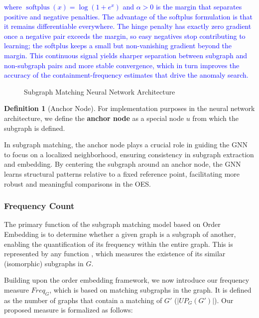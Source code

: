 \documentclass[preprint,12pt]{elsarticle}
\newcommand{\new}[1]{\textcolor{blue}{#1}}
\theoremstyle{plain}
\theoremstyle{definition}
\newtheorem{definition}{Definition}
\theoremstyle{remark}
\begin{document}
\new{where $\operatorname{softplus}(x) = \log(1 + e^{x})$ and $\alpha > 0$ is the margin that separates positive and negative penalties. The advantage of the softplus formulation is that it remains differentiable everywhere. The hinge penalty has exactly zero gradient once a negative pair exceeds the margin, so easy negatives stop contributing to learning; the softplus keeps a small but non-vanishing gradient beyond the margin. This continuous signal yields sharper separation between subgraph and non-subgraph pairs and more stable convergence, which in turn improves the accuracy of the containment-frequency estimates that drive the anomaly search.}

\begin{figure}[htbp]
    \centering
    \resizebox{1\linewidth}{!}{}
    \caption{Subgraph Matching Neural Network Architecture}
    \label{fig:network}
\end{figure}

\begin{definition}[Anchor Node]
For implementation purposes in the neural network architecture, we define the \textbf{anchor node} as a special node $u$ from which the subgraph is defined.
\end{definition}
In subgraph matching, the anchor node plays a crucial role in guiding the GNN to focus on a localized neighborhood, ensuring consistency in subgraph extraction and embedding. By centering the subgraph around an anchor node, the GNN learns structural patterns relative to a fixed reference point, facilitating more robust and meaningful comparisons in the OES.

\subsubsection{Frequency Count}
The primary function of the subgraph matching model based on Order Embedding is to determine whether a given graph is a subgraph of another, enabling the quantification of its frequency within the entire graph. This is represented by any function , which measures the existence of its similar (isomorphic) subgraphs in $G$.

Building upon the order embedding framework, we now introduce our frequency measure \( Freq_G \), which is based on matching subgraphs in the graph. It is defined as the number of graphs that contain a matching of \( G' \) ($|UP_G(G')|$). Our proposed measure is formalized as follows:
\end{document}
